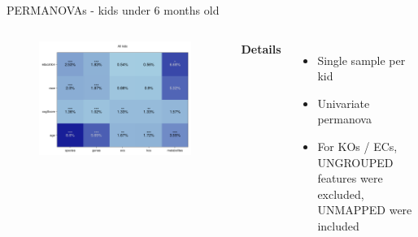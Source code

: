 \begin{frame}{PERMANOVAs - kids under 6 months old}
    \begin{columns}[c] %

    
        \begin{figure}
        \includegraphics[width=1\linewidth]{../figures/kids_all_permanovas.png}
        \end{figure}

    
        \textbf{Details}
        \begin{itemize}
            \item Single sample per kid
            \item Univariate permanova
            \item For KOs / ECs, UNGROUPED features were excluded, UNMAPPED were included
        \end{itemize}

    \end{columns}

\end{frame}

